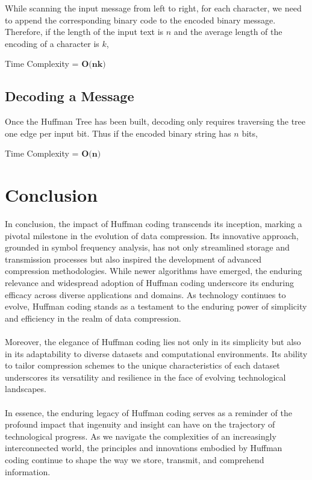 \documentclass[18pt]{article}
\begin{document}
	While scanning the input message from left to right, for each character, we need to append the corresponding binary code to the encoded binary message. Therefore, if the length of the input text is $n$ and the average length of the encoding of a character is $k$, 
	
	Time Complexity = $\textbf{O(nk)}$
	
	\subsection{Decoding a Message}
	
	Once the Huffman Tree has been built, decoding only requires traversing the tree one edge per input bit. Thus if the encoded binary string has $n$ bits,
	
	Time Complexity = $\textbf{O(n)}$
	
	
	\newpage
	
	
	\section{Conclusion}
	
	In conclusion, the impact of Huffman coding transcends its inception, marking a pivotal milestone in the evolution of data compression. Its innovative approach, grounded in symbol frequency analysis, has not only streamlined storage and transmission processes but also inspired the development of advanced compression methodologies. While newer algorithms have emerged, the enduring relevance and widespread adoption of Huffman coding underscore its enduring efficacy across diverse applications and domains. As technology continues to evolve, Huffman coding stands as a testament to the enduring power of simplicity and efficiency in the realm of data compression. \\ \\
	Moreover, the elegance of Huffman coding lies not only in its simplicity but also in its adaptability to diverse datasets and computational environments. Its ability to tailor compression schemes to the unique characteristics of each dataset underscores its versatility and resilience in the face of evolving technological landscapes.\\ \\
	In essence, the enduring legacy of Huffman coding serves as a reminder of the profound impact that ingenuity and insight can have on the trajectory of technological progress. As we navigate the complexities of an increasingly interconnected world, the principles and innovations embodied by Huffman coding continue to shape the way we store, transmit, and comprehend information.
	
	
	\newpage
	
	
	
	
	
\end{document}
